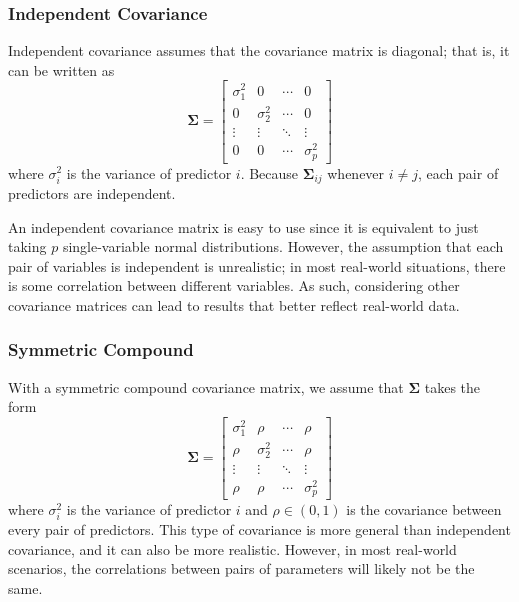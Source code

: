 \documentclass{article}
\begin{document}
\subsubsection{Independent Covariance}
Independent covariance assumes that the covariance matrix is diagonal; that is, it can be written as
\begin{equation}
	\mathbf{\Sigma} = \begin{bmatrix}
		\sigma_1^2 & 0 & \cdots & 0\\
		0 & \sigma_2^2 & \cdots & 0\\
		\vdots & \vdots & \ddots & \vdots\\
		0 & 0 & \cdots & \sigma_p^2
	\end{bmatrix}
\end{equation}
where $\sigma_i^2$ is the variance of predictor $i$. Because $\mathbf{\Sigma}_{ij}$ whenever $i\neq j$, each pair of predictors are independent.

An independent covariance matrix is easy to use since it is equivalent to just taking $p$ single-variable normal distributions. However, the assumption that each pair of variables is independent is unrealistic; in most real-world situations, there is some correlation between different variables. As such, considering other covariance matrices can lead to results that better reflect real-world data.

\subsubsection{Symmetric Compound}
With a symmetric compound covariance matrix, we assume that $\mathbf{\Sigma}$ takes the form
\begin{equation}
	\mathbf{\Sigma} = \begin{bmatrix}
		\sigma_1^2 & \rho & \cdots & \rho\\
		\rho & \sigma_2^2 & \cdots & \rho\\
		\vdots & \vdots & \ddots & \vdots\\
		\rho & \rho & \cdots & \sigma_p^2
	\end{bmatrix}
\end{equation}
where $\sigma_i^2$ is the variance of predictor $i$ and $\rho \in (0, 1)$ is the covariance between every pair of predictors. This type of covariance is more general than independent covariance, and it can also be more realistic. However, in most real-world scenarios, the correlations between pairs of parameters will likely not be the same.
\end{document}
